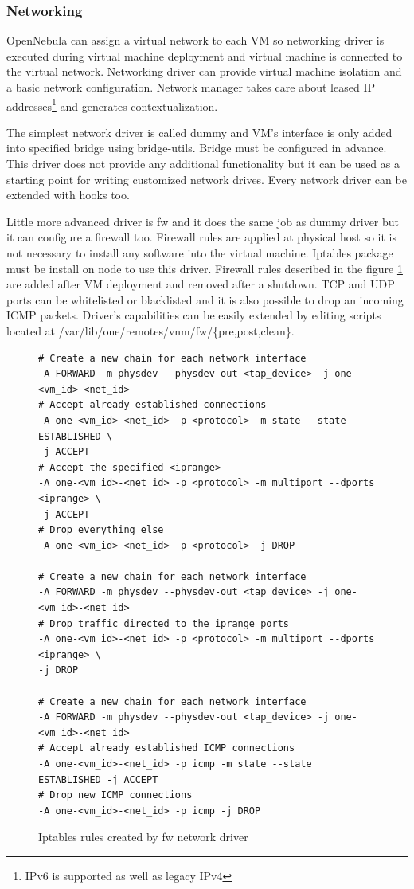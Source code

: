 \subsubsection{Networking}
OpenNebula can assign a virtual network to each \Ac{VM} so networking driver is executed during virtual machine deployment and virtual machine is connected to the virtual network. Networking driver can provide virtual machine isolation and a basic network configuration. Network manager takes care about leased \Ac{IP} addresses\footnote{\Ac{IPv6} is supported as well as legacy \Ac{IPv4}} and generates contextualization.

The simplest network driver is called dummy and \Ac{VM}'s interface is only added into specified bridge using bridge-utils. Bridge must be configured in advance. This driver does not provide any additional functionality but it can be used as a starting point for writing customized network drives. Every network driver can be extended with hooks too.

Little more advanced driver is fw and it does the same job as dummy driver but it can configure a firewall too. Firewall rules are applied at physical host so it is not necessary to install any software into the virtual machine. Iptables package must be install on node to use this driver. Firewall rules described in the figure \ref{code:fw} are added after \Ac{VM} deployment and removed after a shutdown. \Ac{TCP} and \Ac{UDP} ports can be whitelisted or blacklisted and it is also possible to drop an incoming \Ac{ICMP} packets. Driver's capabilities can be easily extended by editing scripts located at /var/lib/one/remotes/vnm/fw/\{pre,post,clean\}.

\begin{figure}[htb]
\label{code:fw}
\begin{verbatim}
# Create a new chain for each network interface
-A FORWARD -m physdev --physdev-out <tap_device> -j one-<vm_id>-<net_id>
# Accept already established connections
-A one-<vm_id>-<net_id> -p <protocol> -m state --state ESTABLISHED \
-j ACCEPT
# Accept the specified <iprange>
-A one-<vm_id>-<net_id> -p <protocol> -m multiport --dports <iprange> \
-j ACCEPT
# Drop everything else
-A one-<vm_id>-<net_id> -p <protocol> -j DROP

# Create a new chain for each network interface
-A FORWARD -m physdev --physdev-out <tap_device> -j one-<vm_id>-<net_id>
# Drop traffic directed to the iprange ports
-A one-<vm_id>-<net_id> -p <protocol> -m multiport --dports <iprange> \
-j DROP

# Create a new chain for each network interface
-A FORWARD -m physdev --physdev-out <tap_device> -j one-<vm_id>-<net_id>
# Accept already established ICMP connections
-A one-<vm_id>-<net_id> -p icmp -m state --state ESTABLISHED -j ACCEPT
# Drop new ICMP connections
-A one-<vm_id>-<net_id> -p icmp -j DROP
\end{verbatim}
\caption{Iptables rules created by fw network driver}
\end{figure}

